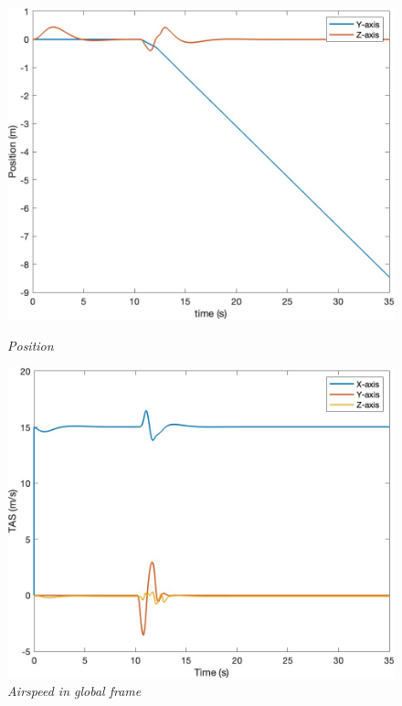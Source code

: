 \begin{figure}[htbp]
  \centering
  \begin{minipage}[b]{0.45\textwidth}
    \centering
    \includegraphics[width=\textwidth]{Images/Gust/Gust FWD pulse 0428/1 position_3.jpg}
    \caption*{\textit{Position}}
  \end{minipage}
  \hfil
  \begin{minipage}[b]{0.45\textwidth}
    \centering
    \includegraphics[width=\textwidth]{Images/Gust/Gust FWD pulse 0428/2 TAS_3.jpg}
    \caption*{\textit{Airspeed in global frame}}
  \end{minipage}

\end{figure}
